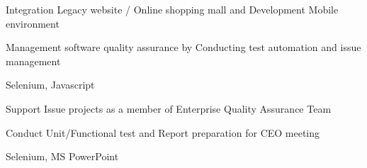 \documentclass[]{deedy-resume-openfont}
\begin{document}
\begin{minipage}[t]{0.55\textwidth}
\begin{tightemize}
\item Integration Legacy website / Online shopping mall and Development Mobile environment
\item Management software quality assurance by Conducting test automation and issue management
\item Selenium, Javascript
\end{tightemize}
\sectionsep

\begin{tightemize}
\item Support Issue projects as a member of Enterprise Quality Assurance Team
\item Conduct Unit/Functional test and Report preparation for CEO meeting
\item Selenium, MS PowerPoint
\end{tightemize}
\sectionsep

\end{minipage} 
\end{document}
